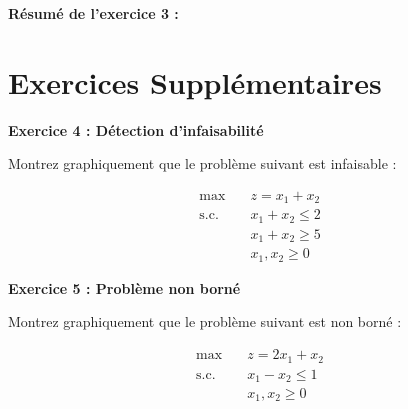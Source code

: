 \documentclass[12pt,a4paper]{article}
\begin{document}
\begin{important}
\textbf{Résumé de l'exercice 3 :}

\begin{center}
\end{center}
\end{important}

\newpage
\section{Exercices Supplémentaires}

\begin{exercice}
\textbf{Exercice 4 : Détection d'infaisabilité}

Montrez graphiquement que le problème suivant est infaisable :

\begin{align*}
\max \quad & z = x_1 + x_2\\
\text{s.c.} \quad & x_1 + x_2 \leq 2\\
& x_1 + x_2 \geq 5\\
& x_1, x_2 \geq 0
\end{align*}
\end{exercice}

\begin{exercice}
\textbf{Exercice 5 : Problème non borné}

Montrez graphiquement que le problème suivant est non borné :

\begin{align*}
\max \quad & z = 2x_1 + x_2\\
\text{s.c.} \quad & x_1 - x_2 \leq 1\\
& x_1, x_2 \geq 0
\end{align*}
\end{exercice}
\end{document}
